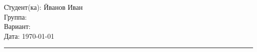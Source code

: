 \begin{tabbing}
	\hspace{11cm} \= Студент(ка): \= Иванов Иван \\ %
	\> Группа:  \\  %
	\> Вариант:  \\    %
	\> Дата: \> \today     %
\end{tabbing}
\hrule
\vspace{1cm}